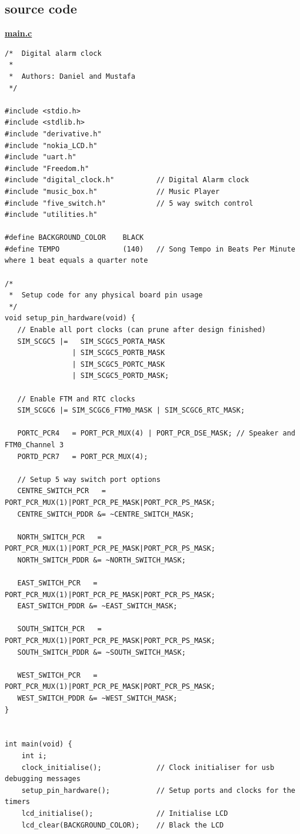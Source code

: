 \documentclass[a4paper]{article}
\begin{document}
\begin{landscape}
\section{source code}
\bf{\underline{main.c}}
\begin{lstlisting}[frame=single]
/*	Digital alarm clock
 * 
 * 	Authors: Daniel and Mustafa
 */

#include <stdio.h>
#include <stdlib.h>
#include "derivative.h"
#include "nokia_LCD.h"
#include "uart.h"
#include "Freedom.h"
#include "digital_clock.h"			// Digital Alarm clock
#include "music_box.h"				// Music Player
#include "five_switch.h"			// 5 way switch control
#include "utilities.h"

#define BACKGROUND_COLOR 	BLACK
#define TEMPO				(140)	// Song Tempo in Beats Per Minute where 1 beat equals a quarter note

/*
 *  Setup code for any physical board pin usage
 */
void setup_pin_hardware(void) {
   // Enable all port clocks (can prune after design finished)
   SIM_SCGC5 |=   SIM_SCGC5_PORTA_MASK
		   	   	| SIM_SCGC5_PORTB_MASK
		   	   	| SIM_SCGC5_PORTC_MASK
		   	   	| SIM_SCGC5_PORTD_MASK;
   
   // Enable FTM and RTC clocks
   SIM_SCGC6 |= SIM_SCGC6_FTM0_MASK | SIM_SCGC6_RTC_MASK;
   
   PORTC_PCR4	= PORT_PCR_MUX(4) | PORT_PCR_DSE_MASK; // Speaker and FTM0_Channel 3
   PORTD_PCR7	= PORT_PCR_MUX(4);
   
   // Setup 5 way switch port options
   CENTRE_SWITCH_PCR   = PORT_PCR_MUX(1)|PORT_PCR_PE_MASK|PORT_PCR_PS_MASK;
   CENTRE_SWITCH_PDDR &= ~CENTRE_SWITCH_MASK;
   
   NORTH_SWITCH_PCR   = PORT_PCR_MUX(1)|PORT_PCR_PE_MASK|PORT_PCR_PS_MASK;
   NORTH_SWITCH_PDDR &= ~NORTH_SWITCH_MASK;   
   
   EAST_SWITCH_PCR   = PORT_PCR_MUX(1)|PORT_PCR_PE_MASK|PORT_PCR_PS_MASK;
   EAST_SWITCH_PDDR &= ~EAST_SWITCH_MASK;
   
   SOUTH_SWITCH_PCR   = PORT_PCR_MUX(1)|PORT_PCR_PE_MASK|PORT_PCR_PS_MASK;
   SOUTH_SWITCH_PDDR &= ~SOUTH_SWITCH_MASK;
   
   WEST_SWITCH_PCR   = PORT_PCR_MUX(1)|PORT_PCR_PE_MASK|PORT_PCR_PS_MASK;
   WEST_SWITCH_PDDR &= ~WEST_SWITCH_MASK;
}


int main(void) {
	int i;
	clock_initialise();				// Clock initialiser for usb debugging messages
	setup_pin_hardware();			// Setup ports and clocks for the timers
	lcd_initialise();				// Initialise LCD
	lcd_clear(BACKGROUND_COLOR);	// Black the LCD


\end{lstlisting}
\end{landscape}
\end{document}
